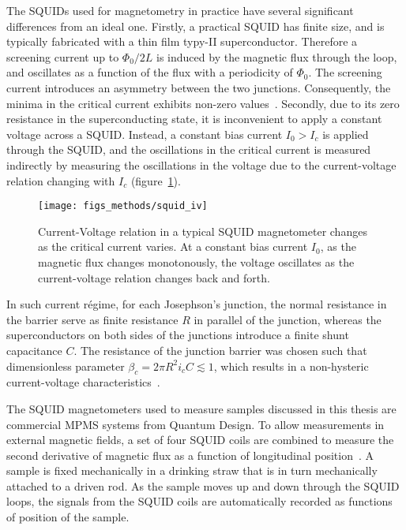 The SQUIDs used for magnetometry in practice have several significant differences from an ideal one. Firstly, a practical SQUID has finite size, and is typically fabricated with a thin film typy-II superconductor. Therefore a screening current up to $\Phi_0 / 2L$ is induced by the magnetic flux through the loop, and oscillates as a function of the flux with a periodicity of $\Phi_0$. The screening current introduces an asymmetry between the two junctions. Consequently, the minima in the critical current exhibits non-zero values~\cite{Clarke1976}. Secondly, due to its zero resistance in the superconducting state, it is inconvenient to apply a constant voltage across a SQUID. Instead, a constant bias current $I_0 > I_c$ is applied through the SQUID, and the oscillations in the critical current is measured indirectly by measuring the oscillations in the voltage due to the current-voltage relation changing with $I_c$ (figure~\ref{fig:squid_iv}). %
\begin{figure}[ht]%
	\centering%
    \texttt{[image: figs\_methods/squid\_iv]}%
    \caption[Current-Voltage relation in a typical SQUID magnetometer]{\label{fig:squid_iv}Current-Voltage relation in a typical SQUID magnetometer changes as the critical current varies. At a constant bias current $I_0$, as the magnetic flux changes monotonously, the voltage oscillates as the current-voltage relation changes back and forth.}%
\end{figure}%
In such current r\'egime, for each Josephson's junction, the normal resistance in the barrier serve as finite resistance $R$ in parallel of the junction, whereas the superconductors on both sides of the junctions introduce a finite shunt capacitance $C$. The resistance of the junction barrier was chosen such that dimensionless parameter $\beta_c = 2\pi{}R^2i_cC \lesssim 1$, which results in a non-hysteric current-voltage characteristics~\cite{Hansma1971}.

The SQUID magnetometers used to measure samples discussed in this thesis are commercial MPMS systems from Quantum Design. To allow measurements in external magnetic fields, a set of four SQUID coils are combined to measure the second derivative of magnetic flux as a function of longitudinal position~\cite{mpms_hardware}. A sample is fixed mechanically in a drinking straw that is in turn mechanically attached to a driven rod. As the sample moves up and down through the SQUID loops, the signals from the SQUID coils are automatically recorded as functions of position of the sample.

